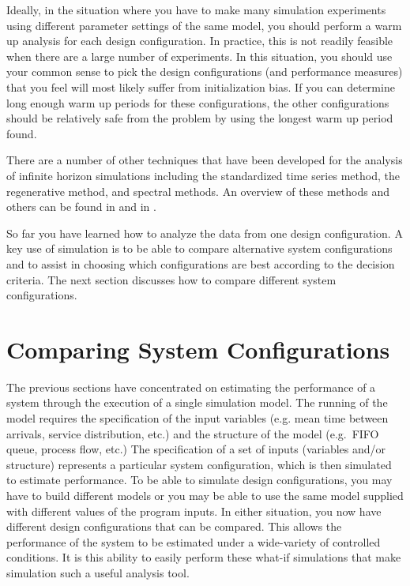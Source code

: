 \documentclass[
]{book}
\theoremstyle{definition}
\theoremstyle{definition}
\theoremstyle{definition}
\theoremstyle{definition}
\theoremstyle{remark}
\begin{document}
Ideally, in the situation where you have to make many simulation
experiments using different parameter settings of the same model, you
should perform a warm up analysis for each design configuration. In
practice, this is not readily feasible when there are a large number of
experiments. In this situation, you should use your common sense to pick
the design configurations (and performance measures) that you feel will
most likely suffer from initialization bias. If you can determine long
enough warm up periods for these configurations, the other
configurations should be relatively safe from the problem by using the
longest warm up period found.

There are a number of other techniques that have been developed for the
analysis of infinite horizon simulations including the standardized time
series method, the regenerative method, and spectral methods. An
overview of these methods and others can be found in
\citep{alexopoulos1998output} and in \citep{law2007simulation}.

So far you have learned how to analyze the data from one design
configuration. A key use of simulation is to be able to compare
alternative system configurations and to assist in choosing which
configurations are best according to the decision criteria. The next
section discusses how to compare different system configurations.

\hypertarget{simoa:comparingSystems}{%
\section{Comparing System Configurations}\label{simoa:comparingSystems}}

The previous sections have concentrated on estimating the performance of
a system through the execution of a single simulation model. The running
of the model requires the specification of the input variables (e.g.
mean time between arrivals, service distribution, etc.) and the
structure of the model (e.g.~FIFO queue, process flow, etc.) The
specification of a set of inputs (variables and/or structure) represents
a particular system configuration, which is then simulated to estimate
performance. To be able to simulate design configurations, you may have
to build different models or you may be able to use the same model
supplied with different values of the program inputs. In either
situation, you now have different design configurations that can be
compared. This allows the performance of the system to be estimated
under a wide-variety of controlled conditions. It is this ability to
easily perform these what-if simulations that make simulation such a
useful analysis tool.
\end{document}
